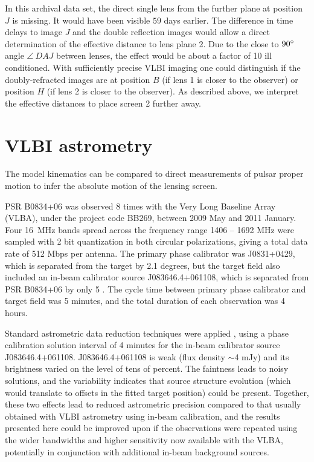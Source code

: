 \documentclass[useAMS,usenatbib]{mn2e}
\begin{document}

In this archival data set, the direct single lens from the further
plane at position $J$ is missing.  It would have been visible $59$ days
earlier.  The difference in time delays to image $J$ and the double
reflection images would allow a direct determination of the effective
distance to lens plane 2.  Due to the close to $90 \degree$ angle $\angle~DAJ$
between lenses, the effect would be about a factor of 10 ill
conditioned.  With sufficiently precise VLBI imaging one could
distinguish if the doubly-refracted images are at position $B$ (if
lens 1 is closer to the observer) or position $H$ (if lens 2 is closer to the observer).  As described above, we interpret
the effective distances to place screen 2 further away.


\section{VLBI astrometry}
\label{sec:astrometry}

The model kinematics can be compared to direct measurements of pulsar
proper motion to infer the absolute motion of the lensing screen.

PSR B0834+06 was observed 8 times with the Very Long Baseline Array (VLBA), under the project code BB269, between 2009 May and 2011 January.  Four 16~MHz bands spread across the frequency range 1406 -- 1692 MHz were sampled with 2 bit quantization in both circular polarizations, giving a total data rate of 512 Mbps per antenna.  The primary phase calibrator was J0831+0429, which is separated from the target by 2.1 degrees, but the target field also included an in-beam calibrator source J083646.4+061108, which is separated from PSR B0834+06 by only 5 \arcmin.  The cycle time between primary phase calibrator and target field was 5 minutes, and the total duration of each observation was 4 hours.

Standard astrometric data reduction techniques were applied
\citep[e.g.,][]{deller12b,deller13a}, using a phase calibration
solution interval of 4 minutes for the in-beam calibrator source
J083646.4+061108.  J083646.4+061108 is weak (flux density $\sim$4 mJy)
and its brightness varied on the level of tens of percent.  The
faintness leads to noisy solutions, and the variability indicates that
source structure evolution (which would translate to offsets in the
fitted target position) could be present.  Together, these two effects
lead to reduced astrometric precision compared to that usually
obtained with VLBI astrometry using in-beam calibration, and the
results presented here could be improved upon if the observations were
repeated using the wider bandwidths and higher sensitivity now
available with the VLBA, potentially in conjunction with additional
in-beam background sources.
\end{document}
